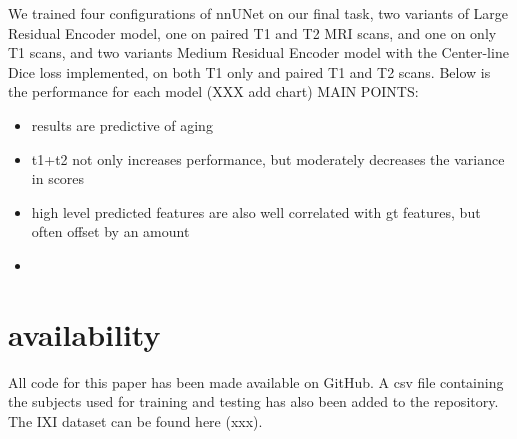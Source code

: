 \documentclass{article}
\begin{document}
We trained four configurations of nnUNet on our final task, two variants of Large Residual Encoder model, one on paired T1 and T2 MRI scans, and one on only T1 scans, and two variants Medium Residual Encoder model with the Center-line Dice loss implemented, on both T1 only and paired T1 and T2 scans. Below is the performance for each model (XXX add chart)
MAIN POINTS:
\begin{itemize}
    \item results are predictive of aging
    \item t1+t2 not only increases performance, but moderately decreases the variance in scores
    \item high level predicted features are also well correlated with gt features, but often offset by an amount
    \item 
    
\end{itemize}

\section{availability}

All code for this paper has been made available on GitHub. A csv file containing the subjects used for training and testing has also been added to the repository. The IXI dataset can be found here (xxx). 
\end{document}
